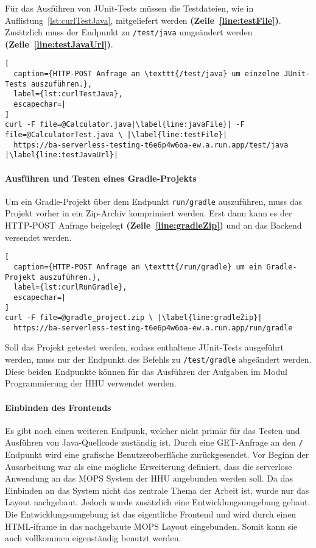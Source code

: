 Für das Ausführen von JUnit-Tests müssen die Testdateien, wie in Auflistung~\ref{lst:curlTestJava},
mitgeliefert werden \textbf{(Zeile~\ref{line:testFile})}.
Zusätzlich muss der Endpunkt zu \texttt{/test/java} umgeändert werden
\textbf{(Zeile~\ref{line:testJavaUrl})}.\\

\begin{lstlisting}[
  caption={HTTP-POST Anfrage an \texttt{/test/java} um einzelne JUnit-Tests auszuführen.},
  label={lst:curlTestJava},
  escapechar=|
]
curl -F file=@Calculator.java|\label{line:javaFile}| -F file=@CalculatorTest.java \ |\label{line:testFile}|
  https://ba-serverless-testing-t6e6p4w6oa-ew.a.run.app/test/java |\label{line:testJavaUrl}|
\end{lstlisting}

\paragraph{Ausführen und Testen eines Gradle-Projekts} Um ein Gradle-Projekt
über dem Endpunkt \texttt{run/gradle} auszuführen,
muss das Projekt vorher in ein Zip-Archiv komprimiert werden.
Erst dann kann es der HTTP-POST Anfrage beigelegt \textbf{(Zeile~\ref{line:gradleZip})}
und an das Backend versendet werden.\\

\begin{lstlisting}[
  caption={HTTP-POST Anfrage an \texttt{/run/gradle} um ein Gradle-Projekt auszuführen.},
  label={lst:curlRunGradle},
  escapechar=|
]
curl -F file=@gradle_project.zip \ |\label{line:gradleZip}|
  https://ba-serverless-testing-t6e6p4w6oa-ew.a.run.app/run/gradle
\end{lstlisting}

Soll das Projekt getestet werden, sodass enthaltene JUnit-Tests ausgeführt werden,
muss nur der Endpunkt des Befehls zu \texttt{/test/gradle} abgeändert werden.
Diese beiden Endpunkte können für das Ausführen der Aufgaben im Modul Programmierung
der HHU verwendet werden.

\paragraph{Einbinden des Frontends} Es gibt noch einen weiteren Endpunk, welcher
nicht primär für das Testen und Ausführen von Java-Quellcode zuständig ist.
Durch eine GET-Anfrage an den \texttt{/} Endpunkt wird eine grafische Benutzeroberfläche zurückgesendet.
Vor Beginn der Ausarbeitung war als eine mögliche Erweiterung definiert, dass die serverlose Anwendung an
das MOPS System der HHU angebunden werden soll. Da das Einbinden an das System nicht
das zentrale Thema der Arbeit ist, wurde nur das Layout nachgebaut.
Jedoch wurde zusätzlich eine Entwicklungsumgebung gebaut.
Die Entwicklungsumgebung ist das eigentliche Frontend und wird durch einen HTML-iframe
in das nachgebaute MOPS Layout eingebunden. Somit kann sie auch vollkommen eigenständig benutzt werden.

